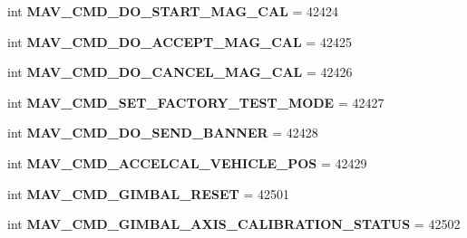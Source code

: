 \begin{DoxyCompactItemize}
int {\bfseries M\+A\+V\+\_\+\+C\+M\+D\+\_\+\+D\+O\+\_\+\+S\+T\+A\+R\+T\+\_\+\+M\+A\+G\+\_\+\+C\+AL} = 42424
\item 
\mbox{\label{namespacepymavlink_1_1dialects_1_1v10_ac28e660289ce59a7be2df35815d0b770}} 
int {\bfseries M\+A\+V\+\_\+\+C\+M\+D\+\_\+\+D\+O\+\_\+\+A\+C\+C\+E\+P\+T\+\_\+\+M\+A\+G\+\_\+\+C\+AL} = 42425
\item 
\mbox{\label{namespacepymavlink_1_1dialects_1_1v10_a4e44513488efe5c1cd064b126c9c8472}} 
int {\bfseries M\+A\+V\+\_\+\+C\+M\+D\+\_\+\+D\+O\+\_\+\+C\+A\+N\+C\+E\+L\+\_\+\+M\+A\+G\+\_\+\+C\+AL} = 42426
\item 
\mbox{\label{namespacepymavlink_1_1dialects_1_1v10_a9f6bc952e7cc03372050efd4175870df}} 
int {\bfseries M\+A\+V\+\_\+\+C\+M\+D\+\_\+\+S\+E\+T\+\_\+\+F\+A\+C\+T\+O\+R\+Y\+\_\+\+T\+E\+S\+T\+\_\+\+M\+O\+DE} = 42427
\item 
\mbox{\label{namespacepymavlink_1_1dialects_1_1v10_a00eb6632d3427848a8c1315e4d42e063}} 
int {\bfseries M\+A\+V\+\_\+\+C\+M\+D\+\_\+\+D\+O\+\_\+\+S\+E\+N\+D\+\_\+\+B\+A\+N\+N\+ER} = 42428
\item 
\mbox{\label{namespacepymavlink_1_1dialects_1_1v10_ad04e826be87eb749278d891189855762}} 
int {\bfseries M\+A\+V\+\_\+\+C\+M\+D\+\_\+\+A\+C\+C\+E\+L\+C\+A\+L\+\_\+\+V\+E\+H\+I\+C\+L\+E\+\_\+\+P\+OS} = 42429
\item 
\mbox{\label{namespacepymavlink_1_1dialects_1_1v10_abd46d07c0fa8aec359a04f2054b67cb8}} 
int {\bfseries M\+A\+V\+\_\+\+C\+M\+D\+\_\+\+G\+I\+M\+B\+A\+L\+\_\+\+R\+E\+S\+ET} = 42501
\item 
\mbox{\label{namespacepymavlink_1_1dialects_1_1v10_a6a1f02ea371c7df7223fb7fea11838eb}} 
int {\bfseries M\+A\+V\+\_\+\+C\+M\+D\+\_\+\+G\+I\+M\+B\+A\+L\+\_\+\+A\+X\+I\+S\+\_\+\+C\+A\+L\+I\+B\+R\+A\+T\+I\+O\+N\+\_\+\+S\+T\+A\+T\+US} = 42502
\item 
\mbox{\label{namespacepymavlink_1_1dialects_1_1v10_aa61071cdd8710a45ab904366aef52670}} 

\end{DoxyCompactItemize}
